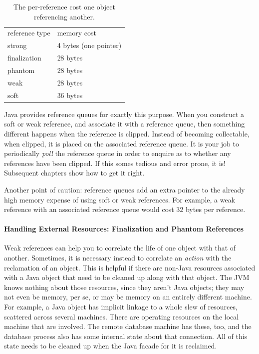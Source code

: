 \begin{table}
\centering
	\begin{tabular}{ll}
		\toprule
		reference type & memory cost \\
        \cmidrule(r){1-1} \cmidrule(l){2-2}		
		strong         & 4 bytes (one pointer) \\
		finalization   & 28 bytes \\
        phantom        & 28 bytes \\ 
		weak           & 28 bytes \\
		soft           & 36 bytes \\
		\bottomrule
	\end{tabular}
	\caption{The per-reference cost one object
	referencing another.}
	\label{tab:reference-costs}
\end{table}
Java provides reference queues for exactly this purpose. When you construct a
soft or weak reference, and associate it with a reference queue, then something
different happens when the reference is clipped. Instead of becoming
collectable, when clipped, it is placed on the associated reference queue. It is
your job to periodically \emph{poll} the reference queue in order to enquire as
to whether any references have been clipped. If this somes tedious and error
prone, it is! Subsequent chapters show how to get it right.

Another point of caution: reference queues add an extra pointer to the already
high memory expense of using soft or weak references. For example, a weak
reference with an associated reference queue would cost 32 bytes per reference.

\paragraph{Handling External Resources: Finalization and Phantom References}

Weak references can help you to correlate the life of one object with that of
another. Sometimes, it is necessary instead to correlate an \emph{action} with
the reclamation of an object. This is helpful if there are non-Java resources
associated with a Java object that need to be cleaned up along with that object.
The JVM knows nothing about those resources, since they aren't Java objects;
they may not even be memory, per se, or may be memory on an entirely different
machine. For example, a Java  object has implicit
linkage to a whole slew of resources, scattered across several machines. There
are operating resources on the local machine that are involved. The remote
database machine has these, too, and the database process also has some
internal state about that connection. All of this state needs to be cleaned up
when the Java facade for it is reclaimed.

